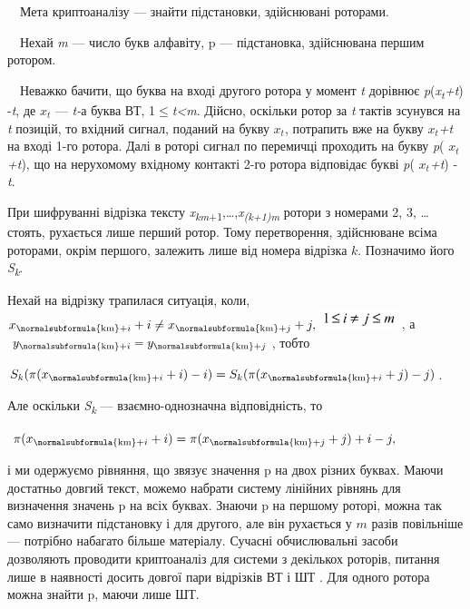 \ \ Мета криптоаналізу --- знайти підстановки, здійснювані роторами.

\ \ Нехай \textit{m} --- число букв алфавіту, \textgreek{p --- }підстановка,
здійснювана першим ротором.

\ \ Неважко бачити, що буква на вході другого ротора у момент \textit{t}
дорівнює
\textit{\textgreek{p}}(\textit{x}\textit{\textsubscript{t}}\textit{+}\textit{t})
-\textit{t}, де   ${x_{{t}}}$ --- \textit{t}\textit{{}-}а\textit{ }буква ВТ,
1${\leq}$\textit{t}\textit{{\textless}}\textit{m}. Дійсно, оскільки ротор за
\textit{t}\textit{ }тактів зсунувся на \textit{t}\textit{ }позицій, то вхідний
сигнал, поданий на букву ${x_{{t}}}$, потрапить вже на букву 
${x_{{t}}}$\textit{+t }на вході 1-го ротора. Далі в роторі сигнал по перемичці
проходить на букву \textit{\textgreek{p}}( ${x_{{t}}}$\textit{+}\textit{t}), що
на нерухомому вхідному контакті 2-го ротора відповідає букві
\textit{\textgreek{p}}( ${x_{{t}}}$\textit{+}\textit{t}) -\textit{t}. 

При шифруванні відрізка тексту
\textit{x}\textit{\textsubscript{km}}\textsubscript{+1},…,\textit{x}\textit{\textsubscript{(}}\textit{\textsubscript{k}}\textit{\textsubscript{+1)}}\textit{\textsubscript{m}}
ротори з номерами  2, 3, … стоять, рухається лише перший ротор. Тому
перетворення, здійснюване всіма роторами, окрім першого, залежить лише від
номера відрізка  ${k}$. Позначимо його \textit{S}\textit{\textsubscript{k}}.

Нехай на відрізку трапилася ситуація, коли, 
${x_{{\normalsubformula{\text{km}}+i}}+i\neq
x_{{\normalsubformula{\text{km}}+j}}+j,}$ 
\includegraphics[width=0.861in,height=0.222in]{crypt-img/crypt-img80.png} , а 
${y_{{\normalsubformula{\text{km}}+i}}=y_{{\normalsubformula{\text{km}}+j}}}$,
тобто

{\centering
 ${S_{{k}}(\pi (x_{{\normalsubformula{\text{km}}+i}}+i)-i)=S_{{k}}(\pi
(x_{{\normalsubformula{\text{km}}+i}}+j)-j)}$.
\par}

Але оскільки \textit{S}\textit{\textsubscript{k}} --- взаємно{}-однозначна
відповідність, то

{\centering  $ $ ${\pi (x_{{\normalsubformula{\text{km}}+i}}+i)=\pi
(x_{{\normalsubformula{\text{km}}+j}}+j)+i-j,}$\par}

і ми одержуємо рівняння, що зв{\textquotesingle}язує значення  \textgreek{p }на
двох різних буквах. Маючи достатньо довгий текст, можемо набрати систему
лінійних рівнянь для визначення значень \textgreek{p }на всіх буквах. Знаючи
\textgreek{p }на першому роторі, можна так само визначити підстановку і для
другого, але він рухається у  ${m}$ разів повільніше --- потрібно набагато більше
матеріалу. Сучасні обчислювальні засоби дозволяють проводити криптоаналіз для
системи з декількох роторів, питання лише в наявності досить довгої пари
відрізків ВТ і ШТ . Для одного ротора можна знайти \textgreek{p, }маючи лише
ШТ.


